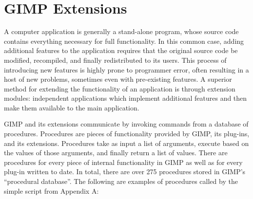 \documentclass{article}
\begin{document}
\section{GIMP Extensions}

A computer application is generally a stand-alone program, whose
source code contains everything necessary for full functionality.  In
this common case, adding additional features to the application
requires that the original source code be modified, recompiled, and
finally redistributed to its users.  This process of introducing new
features is highly prone to programmer error, often resulting in a
host of new problems, sometimes even with pre-existing features.  A
superior method for extending the functionality of an application is
through extension modules: independent applications which implement
additional features and then make them available to the main
application.

GIMP and its extensions communicate by invoking commands from a
database of procedures.  Procedures are pieces of functionality
provided by GIMP, its plug-ins, and its extensions.  Procedures take
as input a list of arguments, execute based on the values of those
arguments, and finally return a list of values.  There are procedures
for every piece of internal functionality in GIMP as well as for
every plug-in written to date.  In total, there are over 275
procedures stored in GIMP's ``procedural database''.  The following are
examples of procedures called by the simple script from Appendix A:
\end{document}
